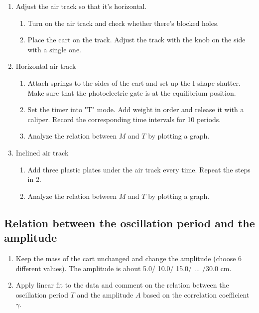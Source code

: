 \begin{enumerate}
\item Adjust the air track so that it's horizontal.

\begin{enumerate}
\item Turn on the air track and check whether there's blocked holes.
\item Place the cart on the track. Adjust the track with the knob on the side
  with a single one. 
\end{enumerate}

\item Horizontal air track

\begin{enumerate}
\item Attach springs to the sides of the cart and set up the I-shape shutter.
  Make sure that the photoelectric gate is at the equilibrium position. 
\item Set the timer into "T" mode. Add weight in order and release it with a
  caliper. Record the corresponding time intervals for 10 periods. 
\item Analyze the relation between $M$ and $T$ by plotting a graph. 
\end{enumerate}

\item Inclined air track

\begin{enumerate}
\item Add three plastic plates under the air track every time. Repeat the steps
  in 2. 
\item Analyze the relation between $M$ and $T$ by plotting a graph.
\end{enumerate}

\end{enumerate}

\subsection{Relation between the oscillation period and the amplitude} 

\begin{enumerate}

\item Keep the mass of the cart unchanged and change the amplitude (choose 6
  different values). The amplitude is about 5.0/ 10.0/ 15.0/ ... /30.0 cm. 
\item Apply linear fit to the data and comment on the relation between the
  oscillation period $T$ and the amplitude $A$ based on the correlation
  coefficient $\gamma$. 
\end{enumerate}

